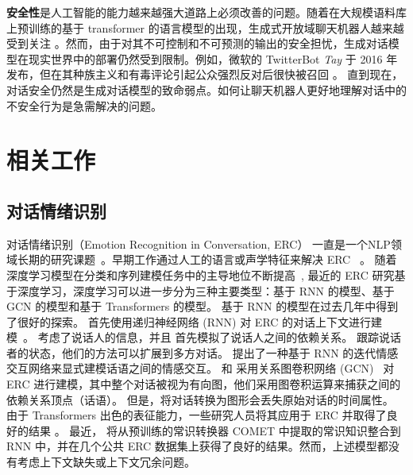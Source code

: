 \textbf{安全性}是人工智能的能力越来越强大道路上必须改善的问题。随着在大规模语料库上预训练的基于 transformer 的语言模型的出现，生成式开放域聊天机器人越来越受到关注 \cite{zhang2020dialogpt,wang2020cdialgpt,adiwardana2020meena}。然而，由于对其不可控制和不可预测的输出的安全担忧，生成对话模型在现实世界中的部署仍然受到限制。例如，微软的 TwitterBot \textit{Tay} 于 2016 年发布，但在其种族主义和有毒评论引起公众强烈反对后很快被召回 \cite{micro2016exam}。
直到现在，对话安全仍然是生成对话模型的致命弱点。如何让聊天机器人更好地理解对话中的不安全行为是急需解决的问题。


\section{相关工作}
\subsection{对话情绪识别}
对话情绪识别（Emotion Recognition in Conversation, ERC） 一直是一个NLP领域长期的研究课题~\cite{devillers2002annotation,lee2005toward}。早期工作通过人工的语言或声学特征来解决 ERC ~\cite{devillers2006real,forbes2004predicting}。 随着深度学习模型在分类和序列建模任务中的主导地位不断提高~\cite{poostchi-etal-2018-bilstm,kipf2016semi,vaswani2017attention},
最近的 ERC 研究基于深度学习，深度学习可以进一步分为三种主要类型：基于 RNN 的模型、基于 GCN 的模型和基于 Transformers 的模型。 基于 RNN 的模型在过去几年中得到了很好的探索。 \citet{poria2017context} 首先使用递归神经网络 (RNN) 对 ERC 的对话上下文进行建模~\cite{medsker2001recurrent}。 \citet{hazarika2018conversational} 考虑了说话人的信息，并且 \citet{hazarika2018icon} 首先模拟了说话人之间的依赖关系。 \citet{majumder2019dialoguernn} 跟踪说话者的状态，他们的方法可以扩展到多方对话。 \citet{lu2020iterative} 提出了一种基于 RNN 的迭代情感交互网络来显式建模话语之间的情感交互。 \citet{ghosal2019dialoguegcn} 和 \citet{sheng2020summarize} 采用关系图卷积网络 (GCN)~\cite{schlichtkrull2018modeling} 对 ERC 进行建模，其中整个对话被视为有向图，他们采用图卷积运算来捕获之间的依赖关系顶点（话语）。 但是，将对话转换为图形会丢失原始对话的时间属性。 由于 Transformers \cite{vaswani2017attention} 出色的表征能力，一些研究人员将其应用于 ERC 并取得了良好的结果 \cite{zhong2019knowledge,li2020hitrans}。 最近，\citet{ghosal2020cosmic} 将从预训练的常识转换器 COMET \cite{bosselut2019comet} 中提取的常识知识整合到 RNN 中，并在几个公共 ERC 数据集上获得了良好的结果。然而，上述模型都没有考虑上下文缺失或上下文冗余问题。


